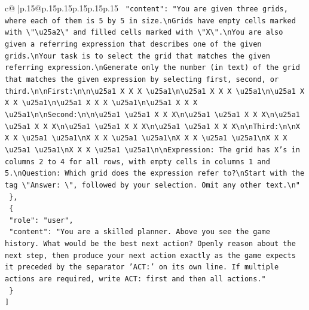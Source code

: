 \documentclass{article}
\begin{document}
{\begin{supertabular}{c@{$\;$}|p{.15\linewidth}@{}p{.15\linewidth}p{.15\linewidth}p{.15\linewidth}p{.15\linewidth}p{.15\linewidth}}
{{{\texttt{    "content": "You are given three grids, where each of them is 5 by 5 in size.\textbackslash{}nGrids have empty cells marked with \textbackslash{}"\textbackslash{}u25a2\textbackslash{}" and filled cells marked with \textbackslash{}"X\textbackslash{}".\textbackslash{}nYou are also given a referring expression that describes one of the given grids.\textbackslash{}nYour task is to select the grid that matches the given referring expression.\textbackslash{}nGenerate only the number (in text) of the grid that matches the given expression by selecting first, second, or third.\textbackslash{}n\textbackslash{}nFirst:\textbackslash{}n\textbackslash{}n\textbackslash{}u25a1 X X X \textbackslash{}u25a1\textbackslash{}n\textbackslash{}u25a1 X X X \textbackslash{}u25a1\textbackslash{}n\textbackslash{}u25a1 X X X \textbackslash{}u25a1\textbackslash{}n\textbackslash{}u25a1 X X X \textbackslash{}u25a1\textbackslash{}n\textbackslash{}u25a1 X X X \textbackslash{}u25a1\textbackslash{}n\textbackslash{}nSecond:\textbackslash{}n\textbackslash{}n\textbackslash{}u25a1 \textbackslash{}u25a1 X X X\textbackslash{}n\textbackslash{}u25a1 \textbackslash{}u25a1 X X X\textbackslash{}n\textbackslash{}u25a1 \textbackslash{}u25a1 X X X\textbackslash{}n\textbackslash{}u25a1 \textbackslash{}u25a1 X X X\textbackslash{}n\textbackslash{}u25a1 \textbackslash{}u25a1 X X X\textbackslash{}n\textbackslash{}nThird:\textbackslash{}n\textbackslash{}nX X X \textbackslash{}u25a1 \textbackslash{}u25a1\textbackslash{}nX X X \textbackslash{}u25a1 \textbackslash{}u25a1\textbackslash{}nX X X \textbackslash{}u25a1 \textbackslash{}u25a1\textbackslash{}nX X X \textbackslash{}u25a1 \textbackslash{}u25a1\textbackslash{}nX X X \textbackslash{}u25a1 \textbackslash{}u25a1\textbackslash{}n\textbackslash{}nExpression: The grid has X's in columns 2 to 4 for all rows, with empty cells in columns 1 and 5.\textbackslash{}nQuestion: Which grid does the expression refer to?\textbackslash{}nStart with the tag \textbackslash{}"Answer: \textbackslash{}", followed by your selection. Omit any other text.\textbackslash{}n"} \\
\texttt{  \},} \\
\texttt{  \{} \\
\texttt{    "role": "user",} \\
\texttt{    "content": "You are a skilled planner. Above you see the game history. What would be the best next action? Openly reason about the next step, then produce your next action exactly as the game expects it preceded by the separator 'ACT:' on its own line. If multiple actions are required, write ACT: first and then all actions."} \\
\texttt{  \}} \\
\texttt{{]}} \\
            }
        }
    }
     \\ \\


\end{supertabular}}
\end{document}
